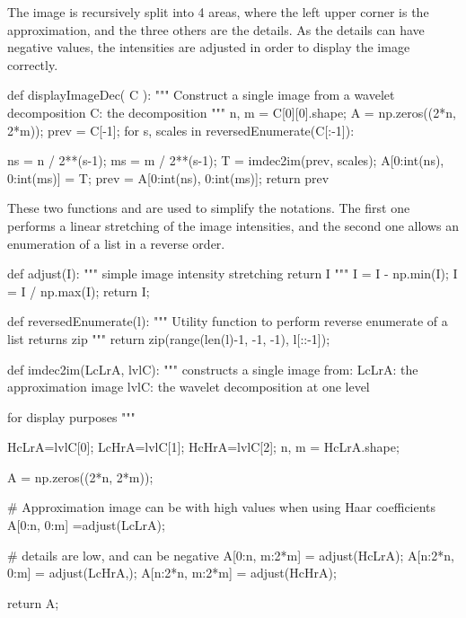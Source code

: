 The image is recursively split into 4 areas, where the left upper corner is the approximation, and the three others are the details. As the details can have negative values, the intensities are adjusted in order to display the image correctly.
\begin{python}
def displayImageDec( C ):
    """
    Construct a single image from a wavelet decomposition
    C: the decomposition
    """
    n, m = C[0][0].shape;
    A = np.zeros((2*n, 2*m));
    prev = C[-1];
    for s, scales in reversedEnumerate(C[:-1]):
      
        ns = n / 2**(s-1);
        ms = m / 2**(s-1); 
        T = imdec2im(prev, scales);
        A[0:int(ns), 0:int(ms)] = T;
        prev = A[0:int(ns), 0:int(ms)];
    return prev
\end{python}

These two functions  and  are used to simplify the notations. The first one performs a linear stretching of the image intensities, and the second one allows an enumeration of a list in a reverse order.
\begin{python}
def adjust(I):
    """
    simple image intensity stretching
    return I
    """
    I = I - np.min(I);
    I = I / np.max(I);
    return I;

def reversedEnumerate(l):
    """
    Utility function to perform reverse enumerate of a list
    returns zip
    """
    return zip(range(len(l)-1, -1, -1), l[::-1]);
\end{python}


\begin{python}
def imdec2im(LcLrA, lvlC):
    """
    constructs a single image from:
    LcLrA: the approximation image
    lvlC: the wavelet decomposition at one level
    
    for display purposes    
    """
    
    HcLrA=lvlC[0];
    LcHrA=lvlC[1];
    HcHrA=lvlC[2];
    n, m = HcLrA.shape;
    
    A = np.zeros((2*n, 2*m));
    
    # Approximation image can be with high values when using Haar coefficients
    A[0:n, 0:m] =adjust(LcLrA);
    
    # details are low, and can be negative
    A[0:n, m:2*m] = adjust(HcLrA);
    A[n:2*n, 0:m] = adjust(LcHrA,);
    A[n:2*n, m:2*m] = adjust(HcHrA);
    
    return A;
\end{python}

